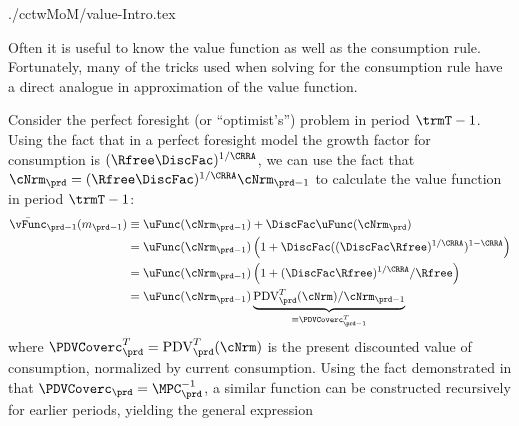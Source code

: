 \documentclass[\econtexRoot/SolvingMicroDSOPs]{subfiles}
\begin{document}
\begin{verbatimwrite}{./cctwMoM/value-Intro.tex}

  Often it is useful to know the value function as well as the consumption rule.  Fortunately, many of the tricks used when solving for the consumption rule have a direct analogue in approximation of the value function.

  Consider the perfect foresight (or ``optimist's'') problem in period $\trmT-1$.  Using the fact that in a perfect foresight model the growth factor for consumption is $(\Rfree \DiscFac)^{1/\CRRA}$, we can use the fact that $\cNrm_{\prd} = (\Rfree \DiscFac)^{1/\CRRA} \cNrm_{\prd-1}$ to calculate the value function in period $\trmT-1$:
  \begin{equation*}\begin{gathered}\begin{aligned}
        \bar{\vFunc}_{\prd-1}(m_{\prd-1})  & \equiv  \uFunc(\cNrm_{\prd-1})+\DiscFac \uFunc(\cNrm_{\prd})
        \\  & = \uFunc(\cNrm_{\prd-1})\left(1+\DiscFac ((\DiscFac\Rfree)^{1/\CRRA})^{1-\CRRA}\right)
        \\  & = \uFunc(\cNrm_{\prd-1})\left(1+(\DiscFac\Rfree)^{1/\CRRA}/\Rfree\right)
        \\  & = \uFunc(\cNrm_{\prd-1})\underbrace{\mbox{PDV}_{\prd}^{T}(\cNrm)/\cNrm_{\prd-1}}_{\equiv \PDVCoverc_{\prd-1}^{T}}
      \end{aligned}\end{gathered}\end{equation*}
  where $\PDVCoverc_{\prd}^{T}=\mbox{PDV}_{\prd}^{T}(\cNrm)$ is the present discounted value of consumption, normalized by current consumption. Using the fact demonstrated in \cite{BufferStockTheory} that $\PDVCoverc_{\prd}=\MPC^{-1}_{\prd}$, a similar function can be constructed recursively for earlier periods, yielding the general expression \hypertarget{vFuncPF}{}
\end{verbatimwrite}
\unskip
\end{document}
